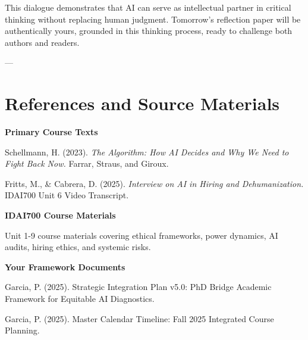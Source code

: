 \documentclass[12pt,letterpaper]{article}
\begin{document}
\begin{puzzleplan}
This dialogue demonstrates that AI can serve as intellectual partner in critical thinking without replacing human judgment. Tomorrow's reflection paper will be authentically yours, grounded in this thinking process, ready to challenge both authors and readers.
\end{puzzleplan}

---

\section*{References and Source Materials}

\textbf{Primary Course Texts}

Schellmann, H. (2023). \textit{The Algorithm: How AI Decides and Why We Need to Fight Back Now.} Farrar, Straus, and Giroux.

Fritts, M., \& Cabrera, D. (2025). \textit{Interview on AI in Hiring and Dehumanization.} IDAI700 Unit 6 Video Transcript.

\textbf{IDAI700 Course Materials}

Unit 1-9 course materials covering ethical frameworks, power dynamics, AI audits, hiring ethics, and systemic risks.

\textbf{Your Framework Documents}

Garcia, P. (2025). Strategic Integration Plan v5.0: PhD Bridge Academic Framework for Equitable AI Diagnostics.

Garcia, P. (2025). Master Calendar Timeline: Fall 2025 Integrated Course Planning.
\end{document}

